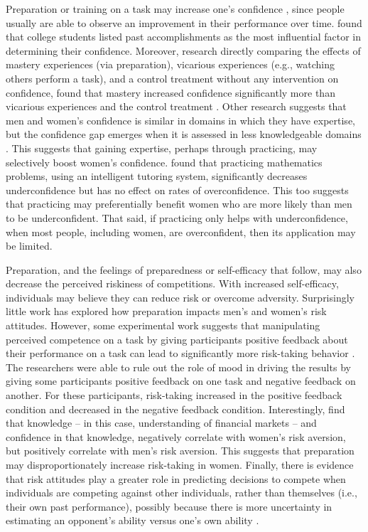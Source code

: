 \documentclass[a4paper,nobind]{templates/ociamthesis}
\begin{document}
Preparation or training on a task may increase one's confidence \autocite{Gist1992,Schunk1981,Schunk1982,Usher2008}, since people usually are able to observe an improvement in their performance over time. \textcite{Lent1996} found that college students listed past accomplishments as the most influential factor in determining their confidence. Moreover, research directly comparing the effects of mastery experiences (via preparation), vicarious experiences (e.g., watching others perform a task), and a control treatment without any intervention on confidence, found that mastery increased confidence significantly more than vicarious experiences and the control treatment \autocite{Bandura1977a}. Other research suggests that men and women's confidence is similar in domains in which they have expertise, but the confidence gap emerges when it is assessed in less knowledgeable domains \autocite{Sarsons2016}. This suggests that gaining expertise, perhaps through practicing, may selectively boost women's confidence. \textcite{Roll2011} found that practicing mathematics problems, using an intelligent tutoring system, significantly decreases underconfidence but has no effect on rates of overconfidence. This too suggests that practicing may preferentially benefit women who are more likely than men to be underconfident. That said, if practicing only helps with underconfidence, when most people, including women, are overconfident, then its application may be limited.

Preparation, and the feelings of preparedness or self-efficacy that follow, may also decrease the perceived riskiness of competitions. With increased self-efficacy, individuals may believe they can reduce risk or overcome adversity. Surprisingly little work has explored how preparation impacts men's and women's risk attitudes. However, some experimental work suggests that manipulating perceived competence on a task by giving participants positive feedback about their performance on a task can lead to significantly more risk-taking behavior \autocite{Krueger1994}. The researchers were able to rule out the role of mood in driving the results by giving some participants positive feedback on one task and negative feedback on another. For these participants, risk-taking increased in the positive feedback condition and decreased in the negative feedback condition. Interestingly, \textcite{Gysler2002} find that knowledge -- in this case, understanding of financial markets -- and confidence in that knowledge, negatively correlate with women's risk aversion, but positively correlate with men's risk aversion. This suggests that preparation may disproportionately increase risk-taking in women. Finally, there is evidence that risk attitudes play a greater role in predicting decisions to compete when individuals are competing against other individuals, rather than themselves (i.e., their own past performance), possibly because there is more uncertainty in estimating an opponent's ability versus one's own ability \autocite{Apicella2017a}.
\end{document}
